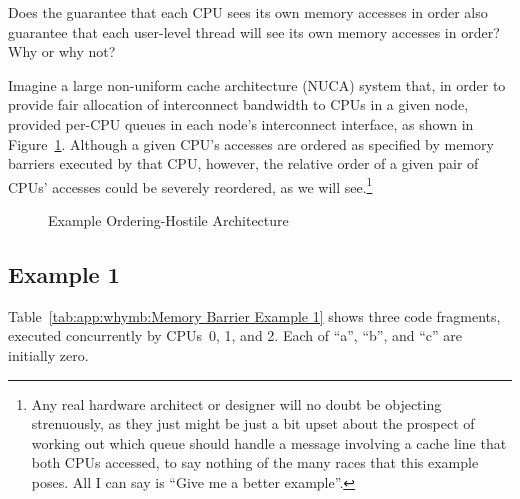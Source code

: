 \QuickQuiz{}
	Does the guarantee that each CPU sees its own memory accesses
	in order also guarantee that each user-level thread will see
	its own memory accesses in order?
	Why or why not?
 \QuickQuizEnd

Imagine a large non-uniform cache architecture (NUCA) system that,
in order to provide fair allocation
of interconnect bandwidth to CPUs in a given node, provided per-CPU
queues in each node's interconnect interface, as shown in
Figure~\ref{fig:app:whymb:Example Ordering-Hostile Architecture}.
Although a given CPU's accesses are ordered as specified by memory
barriers executed by that CPU, however, the relative order of a
given pair of CPUs' accesses could be severely reordered,
as we will see.\footnote{
	Any real hardware architect or designer will no doubt be
	objecting strenuously,
	as they just might be just a bit upset about the prospect of working
	out which queue should handle a message involving a cache line
	that both CPUs accessed, to say nothing of the many races that
	this example poses.
	All I can say is ``Give me a better example''.}

\begin{figure}[htb]
\begin{center}
\end{center}
\caption{Example Ordering-Hostile Architecture}
\label{fig:app:whymb:Example Ordering-Hostile Architecture}
\end{figure}

\subsection{Example 1}
\label{sec:app:whymb:Example 1}

Table~\ref{tab:app:whymb:Memory Barrier Example 1}
shows three code fragments, executed concurrently by CPUs~0, 1, and 2.
Each of ``a'', ``b'', and ``c'' are initially zero.

